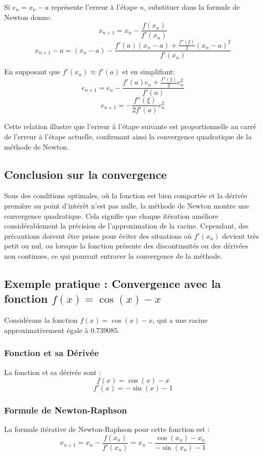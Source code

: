 \documentclass{article}
\begin{document}
Si \( e_n = x_n - a \) représente l'erreur à l'étape \( n \), substituer dans la formule de Newton donne:
\[ x_{n+1} = x_n - \frac{f(x_n)}{f'(x_n)} \]
\[ x_{n+1} - a = (x_n - a) - \frac{f'(a)(x_n - a) + \frac{f''(\xi)}{2}(x_n - a)^2}{f'(x_n)} \]

En supposant que \( f'(x_n) \approx f'(a) \) et en simplifiant:
\[ e_{n+1} = e_n - \frac{f'(a)e_n + \frac{f''(\xi)}{2}e_n^2}{f'(a)} \]
\[ e_{n+1} = -\frac{f''(\xi)}{2f'(a)}e_n^2 \]

Cette relation illustre que l'erreur à l'étape suivante est proportionnelle au carré de l'erreur à l'étape actuelle, confirmant ainsi la convergence quadratique de la méthode de Newton.

\subsection{Conclusion sur la convergence}
Sous des conditions optimales, où la fonction est bien comportée et la dérivée première au point d'intérêt n'est pas nulle, la méthode de Newton montre une convergence quadratique. Cela signifie que chaque itération améliore considérablement la précision de l'approximation de la racine. Cependant, des précautions doivent être prises pour éviter des situations où \( f'(x_n) \) devient très petit ou nul, ou lorsque la fonction présente des discontinuités ou des dérivées non continues, ce qui pourrait entraver la convergence de la méthode.

\subsection{Exemple pratique : Convergence avec la fonction \( f(x) = \cos(x) - x \)}
Considérons la fonction \( f(x) = \cos(x) - x \), qui a une racine approximativement égale à \( 0.739085 \).

\subsubsection{Fonction et sa Dérivée}
La fonction et sa dérivée sont :
$$ f(x) = \cos(x) - x $$
$$ f'(x) = -\sin(x) - 1 $$

\subsubsection{Formule de Newton-Raphson}
La formule itérative de Newton-Raphson pour cette fonction est :
$$ x_{n+1} = x_n - \frac{f(x_n)}{f'(x_n)} = x_n - \frac{\cos(x_n) - x_n}{-\sin(x_n) - 1} $$
\end{document}

